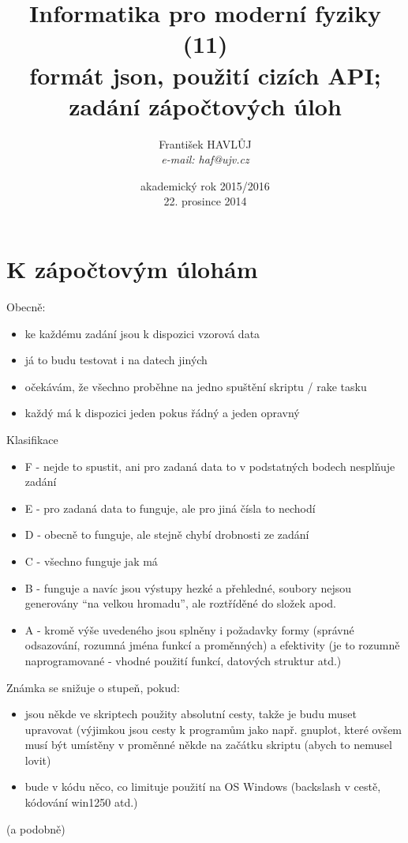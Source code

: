 \documentclass{beamer}
\title[IMF (11)]{Informatika pro moderní fyziky (11)\\ formát json, použití cizích API; zadání zápočtových úloh}
\author[Franti\v{s}ek HAVL\r{U}J, ORF ÚJV Řež]{Franti\v{s}ek HAVL\r{U}J\\{\scriptsize \emph{e-mail: haf@ujv.cz}}}
\date{akademický rok 2015/2016\\22. prosince 2014}
\institute[ORF ÚJV Řež]
{ÚJV Řež\\oddělení Reaktorové fyziky a podpory palivového cyklu}
\begin{document}
\begin{frame}
  \titlepage
\end{frame}

\begin{frame}
  \tableofcontents
\end{frame}

\section{K zápočtovým úlohám}

\begin{frame}{Obecně:}
\begin{itemize}
  \item ke každému zadání jsou k dispozici vzorová data
  \item já to budu testovat i na datech jiných
  \item očekávám, že všechno proběhne na jedno spuštění skriptu / rake tasku
  \item každý má k dispozici jeden pokus řádný a jeden opravný
\end{itemize}
\end{frame}

\begin{frame}{Klasifikace}
  \begin{itemize}
    \item F - nejde to spustit, ani pro zadaná data to v podstatných bodech nesplňuje zadání
    \item E - pro zadaná data to funguje, ale pro jiná čísla to nechodí
    \item D - obecně to funguje, ale stejně chybí drobnosti ze zadání
    \item C - všechno funguje jak má
    \item B - funguje a navíc jsou výstupy hezké a přehledné, soubory nejsou generovány “na velkou hromadu”, ale roztříděné do složek apod.
    \item A - kromě výše uvedeného jsou splněny i požadavky formy (správné odsazování, rozumná jména funkcí a proměnných) a efektivity (je to rozumně naprogramované - vhodné použití funkcí, datových struktur atd.)
  \end{itemize}
\end{frame}

\begin{frame}{Známka se snižuje o stupeň, pokud:}
  \begin{itemize}
    \item jsou někde ve skriptech použity absolutní cesty, takže je budu muset upravovat (výjimkou jsou cesty k programům jako např. gnuplot, které ovšem musí být umístěny v proměnné někde na začátku skriptu (abych to nemusel lovit)
    \item bude v kódu něco, co limituje použití na OS Windows (backslash v cestě, kódování win1250 atd.)
  \end{itemize}
  (a podobně)
\end{frame}
\end{document}
